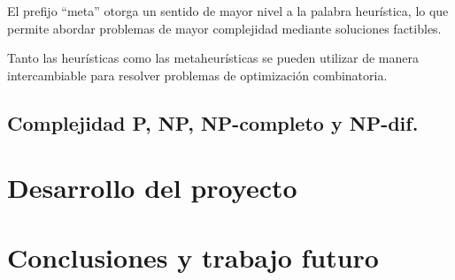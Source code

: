 \documentclass[12pt,titlepage,twoside,openright]{book}
\begin{document}
El prefijo ``meta'' otorga un sentido de mayor nivel a la palabra heur\'istica, lo que permite abordar problemas de mayor complejidad mediante soluciones factibles.

Tanto las heur\'isticas como las metaheur\'isticas se pueden utilizar de manera intercambiable para resolver problemas de optimizaci\'on combinatoria.

\section{Complejidad P, NP, NP-completo y NP-dif\icil.}
\chapter{Desarrollo del proyecto}

\chapter{Conclusiones y trabajo futuro}



\begin{thebibliography}{0}

\end{thebibliography}
\end{document}
